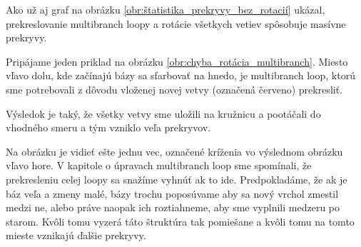 Ako už aj graf na obrázku \ref{obr:štatistika_prekryvy_bez_rotacií} ukázal,
prekreslovanie multibranch loopy a rotácie všetkych vetiev spôsobuje masívne prekryvy.

Pripájame jeden priklad na obrázku \ref{obr:chyba_rotácia_multibranch}. Miesto vľavo dolu, kde začínajú
bázy sa sfarbovať na hnedo, je multibranch loop, ktorú sme potrebovali z dôvodu vloženej novej vetvy
(označená červeno) prekresliť.

Výsledok je taký, že všetky vetvy sme uložili na kružnicu a pootáčali do vhodného smeru a tým vzniklo
veľa prekryvov.

Na obrázku je vidieť ešte jednu vec, označené kríženia vo výslednom obrázku vľavo hore.
V kapitole o úpravach multibranch loop sme spomínali, že prekresleniu celej loopy sa snažíme
vyhnúť ak to ide. Predpokladáme, že ak je báz veľa a zmeny malé, bázy trochu poposúvame aby sa
nový vrchol zmestil medzi ne, alebo práve naopak ich roztiahneme, aby sme vyplnili medzeru po starom.
Kvôli tomu vyzerá táto štruktúra tak pomiešane a kvôli tomu na tomto mieste vznikajú ďalšie prekryvy.

